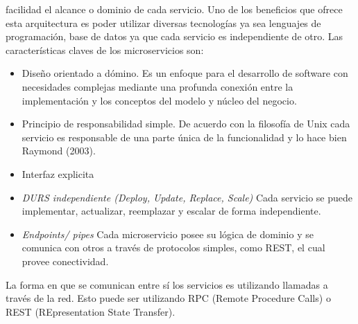 \documentclass[12pt,twoside]{reedthesis}
\providecommand{\tightlist}{%
  \setlength{\itemsep}{0pt}\setlength{\parskip}{0pt}}
\theoremstyle{definition}
\theoremstyle{definition}
\theoremstyle{definition}
\theoremstyle{remark}
\begin{document}
facilidad el alcance o dominio de cada servicio. Uno de los beneficios
que ofrece esta arquitectura es poder utilizar diversas tecnologías ya
sea lenguajes de programación, base de datos ya que cada servicio es
independiente de otro. Las características claves de los microservicios
son:
\begin{itemize}
\tightlist
\item
  Diseño orientado a dómino. Es un enfoque para el desarrollo de
  software con necesidades complejas mediante una profunda conexión
  entre la implementación y los conceptos del modelo y núcleo del
  negocio.
\item
  Principio de responsabilidad simple. De acuerdo con la filosofía de
  Unix cada servicio es responsable de una parte única de la
  funcionalidad y lo hace bien Raymond (2003).
\item
  Interfaz explicita
\item
  \emph{DURS independiente (Deploy, Update, Replace, Scale)} Cada
  servicio se puede implementar, actualizar, reemplazar y escalar de
  forma independiente.
\item
  \emph{Endpoints/ pipes} Cada microservicio posee su lógica de dominio
  y se comunica con otros a través de protocolos simples, como REST, el
  cual provee conectividad.
\end{itemize}
La forma en que se comunican entre sí los servicios es utilizando
llamadas a través de la red. Esto puede ser utilizando RPC (Remote
Procedure Calls) o REST (REpresentation State Transfer).
\end{document}
